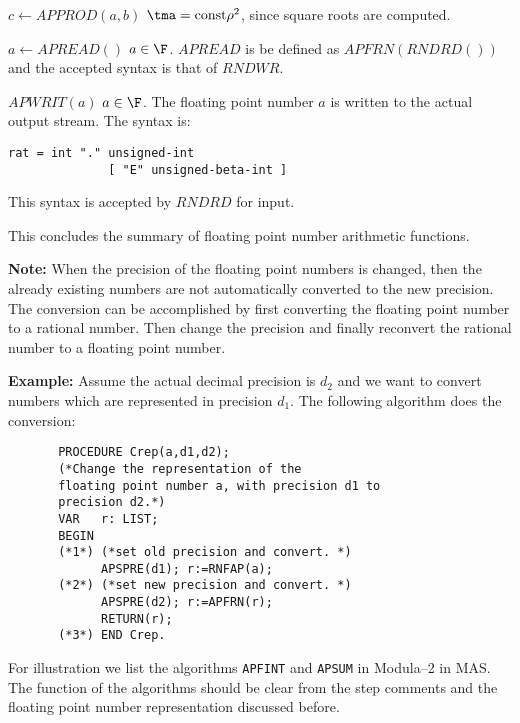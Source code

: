 \begin{deflist}{$c \gets APPROD(a,b)$}
     $\tma = {\rm const} \rho^2$, since square roots are computed.
\item[$a \gets APREAD()$] $a \in \F$.
     $APREAD$ is be defined as $APFRN( RNDRD() )$ 
     and the accepted syntax is that of $RNDWR$.
\item[$APWRIT(a)$] $a \in \F$.
     The floating point number $a$ is written to 
     the actual output stream.
     The syntax is:
\begin{verbatim}
rat = int "." unsigned-int 
              [ "E" unsigned-beta-int ]
\end{verbatim}
     This syntax is accepted by $RNDRD$ for input.
\end{deflist}
This concludes the summary of 
floating point number arithmetic functions.

{\bf Note:} When the precision of the 
floating point numbers is changed, then the 
already existing numbers are not automatically converted
to the new precision. The conversion can be
accomplished by first converting the floating point number to 
a rational number. Then change the precision and finally reconvert
the rational number to a floating point number.

{\bf Example:} Assume the actual decimal precision 
is $d_2$ and we want to convert numbers which are 
represented in precision $d_1$. The following
algorithm does the conversion:
\begin{verbatim}
       PROCEDURE Crep(a,d1,d2);
       (*Change the representation of the 
       floating point number a, with precision d1 to
       precision d2.*)
       VAR   r: LIST;
       BEGIN 
       (*1*) (*set old precision and convert. *)
             APSPRE(d1); r:=RNFAP(a);
       (*2*) (*set new precision and convert. *)
             APSPRE(d2); r:=APFRN(r);
             RETURN(r);
       (*3*) END Crep.
\end{verbatim}

For illustration we list 
the algorithms \verb/APFINT/ and \verb/APSUM/ in Modula--2
in MAS.
The function of the algorithms should be clear from the 
step comments and the floating point number representation 
discussed before.

